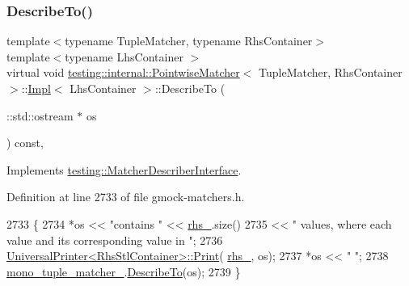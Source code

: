 \subsubsection{\texorpdfstring{Describe\+To()}{DescribeTo()}}
{\footnotesize\ttfamily template$<$typename Tuple\+Matcher, typename Rhs\+Container$>$ \\
template$<$typename Lhs\+Container $>$ \\
virtual void \hyperlink{classtesting_1_1internal_1_1PointwiseMatcher}{testing\+::internal\+::\+Pointwise\+Matcher}$<$ Tuple\+Matcher, Rhs\+Container $>$\+::\hyperlink{classtesting_1_1internal_1_1PointwiseMatcher_1_1Impl}{Impl}$<$ Lhs\+Container $>$\+::Describe\+To (\begin{DoxyParamCaption}\item[{\+::std\+::ostream $\ast$}]{os }\end{DoxyParamCaption}) const\hspace{0.3cm}{\ttfamily [inline]}, {\ttfamily [virtual]}}



Implements \hyperlink{classtesting_1_1MatcherDescriberInterface_ad9f861588bd969b6e3e717f13bb94e7b}{testing\+::\+Matcher\+Describer\+Interface}.



Definition at line 2733 of file gmock-\/matchers.\+h.


\begin{DoxyCode}
2733                                                   \{
2734       *os << \textcolor{stringliteral}{"contains "} << \hyperlink{classtesting_1_1internal_1_1PointwiseMatcher_1_1Impl_a7f00c6c50d20c8c274428106b6c8e9ab}{rhs\_}.size()
2735           << \textcolor{stringliteral}{" values, where each value and its corresponding value in "};
2736       \hyperlink{classtesting_1_1internal_1_1UniversalPrinter_aecec021e1abbaa260b701e24e3fe33eb}{UniversalPrinter<RhsStlContainer>::Print}(
      \hyperlink{classtesting_1_1internal_1_1PointwiseMatcher_1_1Impl_a7f00c6c50d20c8c274428106b6c8e9ab}{rhs\_}, os);
2737       *os << \textcolor{stringliteral}{" "};
2738       \hyperlink{classtesting_1_1internal_1_1PointwiseMatcher_1_1Impl_ac94a851d56fe3f4f900da94cdc08c973}{mono\_tuple\_matcher\_}.\hyperlink{classtesting_1_1internal_1_1MatcherBase_a7e0c883c7745e0d646463077ef1c1267}{DescribeTo}(os);
2739     \}
\end{DoxyCode}
\mbox{\label{classtesting_1_1internal_1_1PointwiseMatcher_1_1Impl_adca4de21c6b463e552b347b28dce22c4}} 
